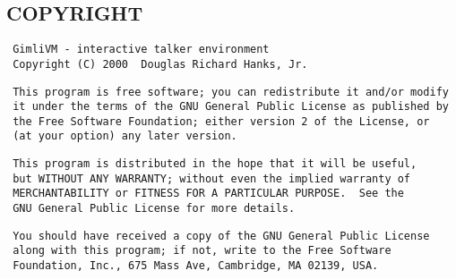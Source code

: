 \subsection*{COPYRIGHT}%
\begin{verbatim}
 GimliVM - interactive talker environment
 Copyright (C) 2000  Douglas Richard Hanks, Jr.
\end{verbatim}
\begin{verbatim}
 This program is free software; you can redistribute it and/or modify
 it under the terms of the GNU General Public License as published by
 the Free Software Foundation; either version 2 of the License, or
 (at your option) any later version.
\end{verbatim}
\begin{verbatim}
 This program is distributed in the hope that it will be useful,
 but WITHOUT ANY WARRANTY; without even the implied warranty of
 MERCHANTABILITY or FITNESS FOR A PARTICULAR PURPOSE.  See the
 GNU General Public License for more details.
\end{verbatim}
\begin{verbatim}
 You should have received a copy of the GNU General Public License
 along with this program; if not, write to the Free Software
 Foundation, Inc., 675 Mass Ave, Cambridge, MA 02139, USA.
\end{verbatim}

